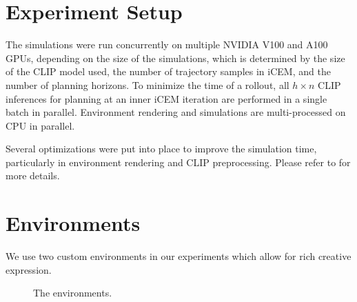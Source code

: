\section{Experiment Setup}
\label{sec:experiment-setup}

The simulations were run concurrently on multiple NVIDIA V100 and A100 GPUs, depending on the size of the simulations, which is determined by the size of the CLIP model used, the number of trajectory samples in iCEM, and the number of planning horizons.
To minimize the time of a rollout, all \(h \times n\) CLIP inferences for planning at an inner iCEM iteration are performed in a single batch in parallel.
Environment rendering and simulations are multi-processed on CPU in parallel.

Several optimizations were put into place to improve the simulation time, particularly in environment rendering and CLIP preprocessing.
Please refer to  for more details.

\section{Environments}
\label{sec:environments}
We use two custom environments in our experiments which allow for rich creative expression.

\begin{figure}[H]
    \centering
    \qquad
    \caption{The environments.}
    \label{fig:environments}
\end{figure}

